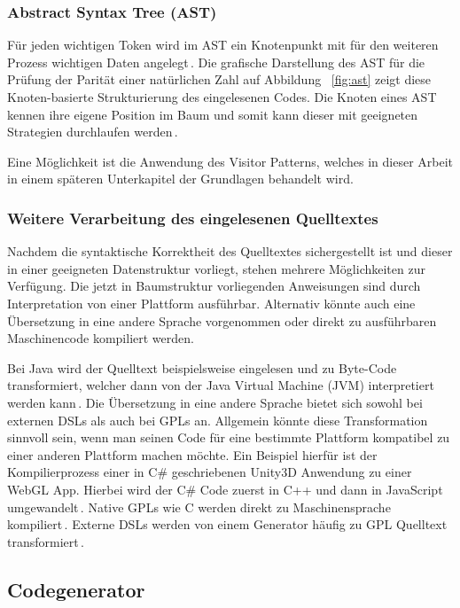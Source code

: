 \documentclass[12pt,oneside,a4paper,parskip]{scrbook}
\begin{document}
\subsubsection{Abstract Syntax Tree (AST)}

Für jeden wichtigen Token wird im AST ein Knotenpunkt mit für den weiteren Prozess wichtigen Daten angelegt\,\cite[S. 23]{parr2009}. Die grafische Darstellung  des AST für die Prüfung der Parität einer natürlichen Zahl auf Abbildung ~\ref{fig:ast} zeigt diese Knoten-basierte Strukturierung des eingelesenen Codes. Die Knoten eines AST kennen ihre eigene Position im Baum und somit kann dieser mit geeigneten Strategien durchlaufen werden\,\cite[S. 24]{parr2009}.

Eine Möglichkeit ist die Anwendung des Visitor Patterns, welches in dieser Arbeit in einem späteren Unterkapitel der Grundlagen behandelt wird.

\subsubsection{Weitere Verarbeitung des eingelesenen Quelltextes}

Nachdem die syntaktische Korrektheit des Quelltextes sichergestellt ist und dieser in einer geeigneten Datenstruktur vorliegt, stehen mehrere Möglichkeiten zur Verfügung. Die jetzt in Baumstruktur vorliegenden Anweisungen sind durch Interpretation von einer Plattform ausführbar. Alternativ könnte auch eine Übersetzung in eine andere Sprache vorgenommen oder direkt zu ausführbaren Maschinencode kompiliert werden.

Bei Java wird der Quelltext beispielsweise eingelesen und zu Byte-Code transformiert, welcher dann von der Java Virtual Machine (JVM) interpretiert werden kann\,\cite{javavm2014}. Die Übersetzung in eine andere Sprache bietet sich sowohl bei externen DSLs als auch bei GPLs an. Allgemein könnte diese Transformation sinnvoll sein, wenn man seinen Code für eine bestimmte Plattform kompatibel zu einer anderen Plattform machen möchte. Ein Beispiel hierfür ist der Kompilierprozess einer in C\# geschriebenen Unity3D Anwendung zu einer WebGL App. Hierbei wird der C\# Code zuerst in C++ und dann in JavaScript umgewandelt\,\cite{unity2018}. Native GPLs wie C werden direkt zu Maschinensprache kompiliert\,\cite{kernighan1988}. Externe DSLs werden von einem Generator häufig zu GPL Quelltext transformiert\,\cite[S. 26]{voelter2013}.

\subsection{Codegenerator}
\end{document}
